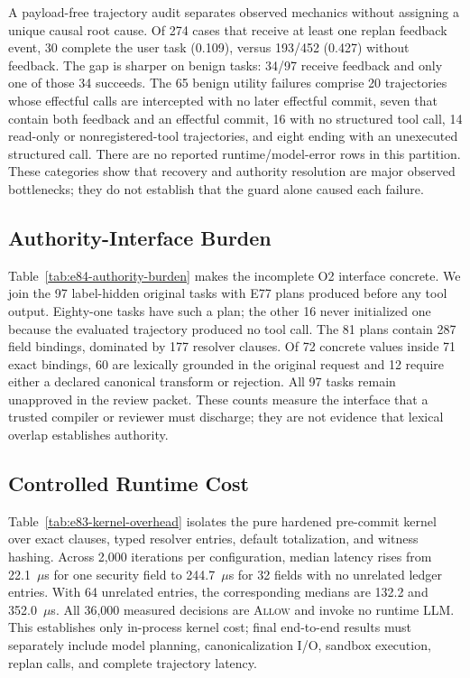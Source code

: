 A payload-free trajectory audit separates observed mechanics without assigning a unique causal root cause. Of 274 cases that receive at least one replan feedback event, 30 complete the user task (0.109), versus 193/452 (0.427) without feedback. The gap is sharper on benign tasks: 34/97 receive feedback and only one of those 34 succeeds. The 65 benign utility failures comprise 20 trajectories whose effectful calls are intercepted with no later effectful commit, seven that contain both feedback and an effectful commit, 16 with no structured tool call, 14 read-only or nonregistered-tool trajectories, and eight ending with an unexecuted structured call. There are no reported runtime/model-error rows in this partition. These categories show that recovery and authority resolution are major observed bottlenecks; they do not establish that the guard alone caused each failure.

\subsection{Authority-Interface Burden}



Table~\ref{tab:e84-authority-burden} makes the incomplete O2 interface concrete. We join the 97 label-hidden original tasks with E77 plans produced before any tool output. Eighty-one tasks have such a plan; the other 16 never initialized one because the evaluated trajectory produced no tool call. The 81 plans contain 287 field bindings, dominated by 177 resolver clauses. Of 72 concrete values inside 71 exact bindings, 60 are lexically grounded in the original request and 12 require either a declared canonical transform or rejection. All 97 tasks remain unapproved in the review packet. These counts measure the interface that a trusted compiler or reviewer must discharge; they are not evidence that lexical overlap establishes authority.

\subsection{Controlled Runtime Cost}



Table~\ref{tab:e83-kernel-overhead} isolates the pure hardened pre-commit kernel over exact clauses, typed resolver entries, default totalization, and witness hashing. Across 2,000 iterations per configuration, median latency rises from 22.1~$\mu$s for one security field to 244.7~$\mu$s for 32 fields with no unrelated ledger entries. With 64 unrelated entries, the corresponding medians are 132.2 and 352.0~$\mu$s. All 36,000 measured decisions are \textsc{Allow} and invoke no runtime LLM. This establishes only in-process kernel cost; final end-to-end results must separately include model planning, canonicalization I/O, sandbox execution, replan calls, and complete trajectory latency.

